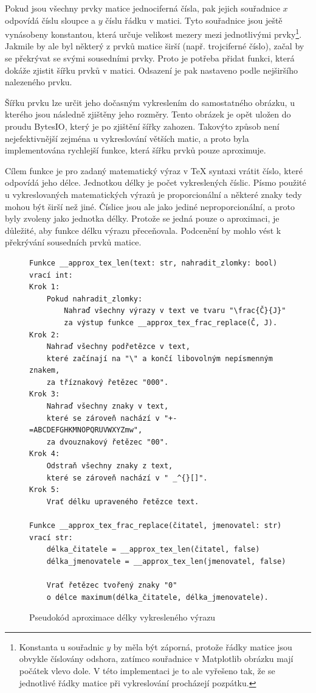 \documentclass[FM]{tulthesis}
\begin{document}
	Pokud jsou všechny prvky matice jednociferná čísla, pak jejich souřadnice $x$ odpovídá číslu sloupce a $y$ číslu řádku v matici. Tyto souřadnice jsou ještě vynásobeny konstantou, která určuje velikost mezery mezi jednotlivými prvky\footnote{Konstanta u souřadnic $y$ by měla být záporná, protože řádky matice jsou obvykle číslovány odshora, zatímco souřadnice v Matplotlib obrázku mají počátek vlevo dole. V této implementaci je to ale vyřešeno tak, že se jednotlivé řádky matice při vykreslování procházejí pozpátku.}. Jakmile by ale byl některý z prvků matice širší (např. trojciferné číslo), začal by se překrývat se svými sousedními prvky. Proto je potřeba přidat funkci, která dokáže zjistit šířku prvků v matici. Odsazení je pak nastaveno podle nejširšího nalezeného prvku.
	
	Šířku prvku lze určit jeho dočasným vykreslením do samostatného obrázku, u kterého jsou následně zjištěny jeho rozměry. Tento obrázek je opět uložen do proudu BytesIO, který je po zjištění šířky zahozen. Takovýto způsob není nejefektivnější zejména u vykreslování větších matic, a proto byla implementována rychlejší funkce, která šířku prvků pouze aproximuje.

	Cílem funkce je pro zadaný matematický výraz v TeX syntaxi vrátit číslo, které odpovídá jeho délce. Jednotkou délky je počet vykreslených číslic. Písmo použité u vykreslovaných matematických výrazů je proporcionální a některé znaky tedy mohou být širší než jiné. Číslice jsou ale jako jediné neproporcionální, a proto byly zvoleny jako jednotka délky. Protože se jedná pouze o aproximaci, je důležité, aby funkce délku výrazu přeceňovala. Podcenění by mohlo vést k překrývání sousedních prvků matice.
		
	\begin{figure}[ht]
		\begin{lstlisting}[language=Pseudo1]
Funkce __approx_tex_len(text: str, nahradit_zlomky: bool) vrací int:
Krok 1:
	Pokud nahradit_zlomky:
		Nahraď všechny výrazy v text ve tvaru "\frac{Č}{J}"
		za výstup funkce __approx_tex_frac_replace(Č, J).
Krok 2:
	Nahraď všechny podřetězce v text,
	které začínají na "\" a končí libovolným nepísmenným znakem,
	za tříznakový řetězec "000".
Krok 3:
	Nahraď všechny znaky v text,
	které se zároveň nachází v "+-=ABCDEFGHKMNOPQRUVWXYZmw",
	za dvouznakový řetězec "00".
Krok 4:
	Odstraň všechny znaky z text,
	které se zároveň nachází v " _^{}[]".
Krok 5:
	Vrať délku upraveného řetězce text.
	
Funkce __approx_tex_frac_replace(čitatel, jmenovatel: str) vrací str:
	délka_čitatele = __approx_tex_len(čitatel, false)
	délka_jmenovatele = __approx_tex_len(jmenovatel, false)

	Vrať řetězec tvořený znaky "0"
	o délce maximum(délka_čitatele, délka_jmenovatele).
		\end{lstlisting}
		\caption{Pseudokód aproximace délky vykresleného výrazu}
	\end{figure}
	
\end{document}
